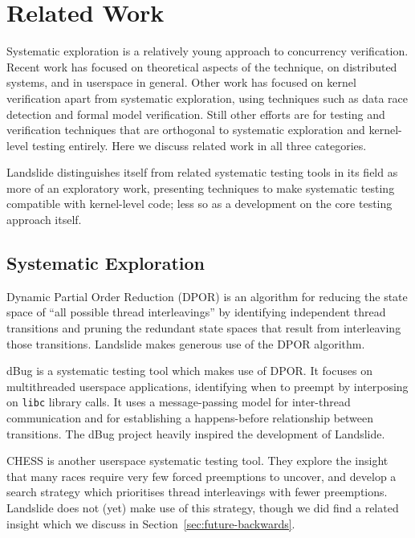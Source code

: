\section{Related Work}

Systematic exploration is a relatively young approach to concurrency verification.
Recent work has focused on theoretical aspects of the technique, on distributed systems, and in userspace in general.
Other work has focused on kernel verification apart from systematic exploration, using techniques such as data race detection and formal model verification.
Still other efforts are for testing and verification techniques that are orthogonal to systematic exploration and kernel-level testing entirely.
Here we discuss related work in all three categories.

Landslide distinguishes itself from related systematic testing tools in its field as more of an exploratory work, presenting techniques to make systematic testing compatible with kernel-level code; less so as a development on the core testing approach itself.

\subsection{Systematic Exploration}

Dynamic Partial Order Reduction (DPOR)\hspace{0in}\cite{dpor,sdpor,dbug-retreat,distributed-dpor} is an algorithm for reducing the state space of ``all possible thread interleavings'' by identifying independent thread transitions and pruning the redundant state spaces that result from interleaving those transitions. Landslide makes generous use of the DPOR algorithm.

dBug\cite{dbug-ssv} is a systematic testing tool which makes use of DPOR. It focuses on multithreaded userspace applications, identifying when to preempt by interposing on \texttt{libc} library calls. It uses a message-passing model for inter-thread communication and for establishing a happens-before relationship between transitions. The dBug project heavily inspired the development of Landslide.

CHESS\cite{chess} is another userspace systematic testing tool. They explore the insight that many races require very few forced preemptions to uncover, and develop a search strategy which prioritises thread interleavings with fewer preemptions. Landslide does not (yet) make use of this strategy, though we did find a related insight which we discuss in Section~\ref{sec:future-backwards}.

